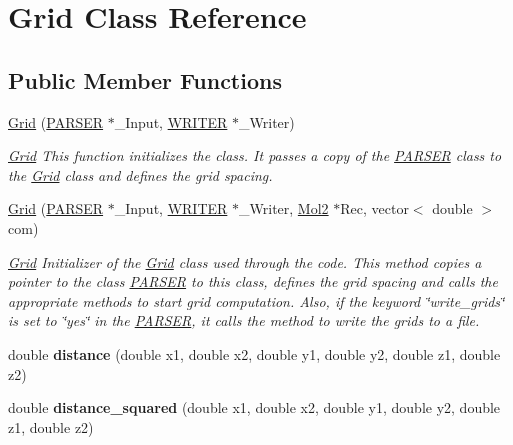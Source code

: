 \hypertarget{classGrid}{
\section{Grid Class Reference}
\label{classGrid}
}
\subsection*{Public Member Functions}
\begin{DoxyCompactItemize}
\item 
\hyperlink{classGrid_abac50becd4d0bc1c1763533d200daee8}{Grid} (\hyperlink{classPARSER}{PARSER} $\ast$\_\-Input, \hyperlink{classWRITER}{WRITER} $\ast$\_\-Writer)
\begin{DoxyCompactList}\small\item\em \hyperlink{classGrid}{Grid} This function initializes the class. It passes a copy of the \hyperlink{classPARSER}{PARSER} class to the \hyperlink{classGrid}{Grid} class and defines the grid spacing. \item\end{DoxyCompactList}\item 
\hyperlink{classGrid_a67c0d815b4faf1e9f7f6e2a8b52150c8}{Grid} (\hyperlink{classPARSER}{PARSER} $\ast$\_\-Input, \hyperlink{classWRITER}{WRITER} $\ast$\_\-Writer, \hyperlink{classMol2}{Mol2} $\ast$Rec, vector$<$ double $>$ com)
\begin{DoxyCompactList}\small\item\em \hyperlink{classGrid}{Grid} Initializer of the \hyperlink{classGrid}{Grid} class used through the code. This method copies a pointer to the class \hyperlink{classPARSER}{PARSER} to this class, defines the grid spacing and calls the appropriate methods to start grid computation. Also, if the keyword \char`\"{}write\_\-grids\char`\"{} is set to \char`\"{}yes\char`\"{} in the \hyperlink{classPARSER}{PARSER}, it calls the method to write the grids to a file. \item\end{DoxyCompactList}\item 
\hypertarget{classGrid_a900f4d89b824efe38fd1649f1224c8be}{
double {\bfseries distance} (double x1, double x2, double y1, double y2, double z1, double z2)}
\label{classGrid_a900f4d89b824efe38fd1649f1224c8be}

\item 
\hypertarget{classGrid_a5221efd9d8edfe17a44c7bc92badee9b}{
double {\bfseries distance\_\-squared} (double x1, double x2, double y1, double y2, double z1, double z2)}
\label{classGrid_a5221efd9d8edfe17a44c7bc92badee9b}


\end{DoxyCompactItemize}

